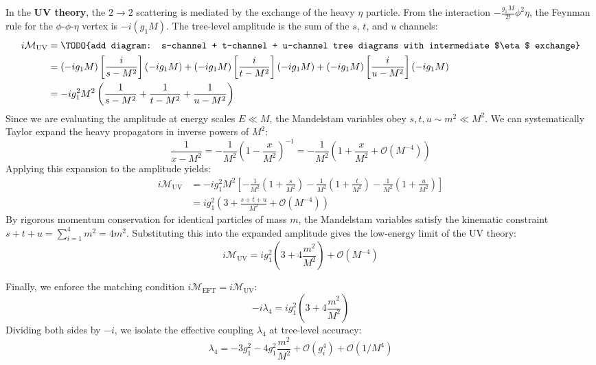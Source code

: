In the \textbf{UV theory}, the $2 \to 2$ scattering is mediated by the exchange of the heavy $\eta$ particle. From the interaction $-\frac{g_1 M}{2!} \phi^2 \eta$, the Feynman rule for the $\phi$-$\phi$-$\eta$ vertex is $-i(g_1 M)$. The tree-level amplitude is the sum of the $s$, $t$, and $u$ channels:
\[
    \begin{aligned}
        i\mathcal{M}_{\text{UV}} & = \text{\TODO{add diagram: s-channel + t-channel + u-channel tree diagrams with intermediate $\eta$ exchange}}                                                       \\
                                 & = (-ig_1 M) \left[ \frac{i}{s - M^2} \right] (-ig_1 M) + (-ig_1 M) \left[ \frac{i}{t - M^2} \right] (-ig_1 M) + (-ig_1 M) \left[ \frac{i}{u - M^2} \right] (-ig_1 M) \\
                                 & = -i g_1^2 M^2 \left( \frac{1}{s - M^2} + \frac{1}{t - M^2} + \frac{1}{u - M^2} \right)
    \end{aligned}
\]
Since we are evaluating the amplitude at energy scales $E \ll M$, the Mandelstam variables obey $s, t, u \sim m^2 \ll M^2$. We can systematically Taylor expand the heavy propagators in inverse powers of $M^2$:
\[
    \frac{1}{x - M^2} = -\frac{1}{M^2} \left( 1 - \frac{x}{M^2} \right)^{-1} = -\frac{1}{M^2} \left( 1 + \frac{x}{M^2} + \mathcal{O}(M^{-4}) \right)
\]
Applying this expansion to the amplitude yields:
\[
    \begin{aligned}
        i\mathcal{M}_{\text{UV}} & = -i g_1^2 M^2 \left[ -\frac{1}{M^2}\left(1 + \frac{s}{M^2}\right) - \frac{1}{M^2}\left(1 + \frac{t}{M^2}\right) - \frac{1}{M^2}\left(1 + \frac{u}{M^2}\right) \right] \\
                                 & = i g_1^2 \left( 3 + \frac{s + t + u}{M^2} + \mathcal{O}(M^{-4}) \right)
    \end{aligned}
\]
By rigorous momentum conservation for identical particles of mass $m$, the Mandelstam variables satisfy the kinematic constraint $s + t + u = \sum_{i=1}^4 m^2 = 4m^2$. Substituting this into the expanded amplitude gives the low-energy limit of the UV theory:
\[
    i\mathcal{M}_{\text{UV}} = i g_1^2 \left( 3 + 4\frac{m^2}{M^2} \right) + \mathcal{O}(M^{-4})
\]

Finally, we enforce the matching condition $i\mathcal{M}_{\text{EFT}} = i\mathcal{M}_{\text{UV}}$:
\[
    -i\lambda_4 = i g_1^2 \left( 3 + 4\frac{m^2}{M^2} \right)
\]
Dividing both sides by $-i$, we isolate the effective coupling $\lambda_4$ at tree-level accuracy:
\[
    \lambda_4 = -3g_1^2 - 4g_1^2 \frac{m^2}{M^2} + \mathcal{O}(g_i^4) + \mathcal{O}(1/M^4)
\]


